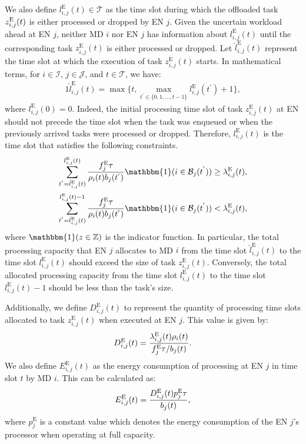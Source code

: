 \documentclass[12pt,draftclsnofoot,onecolumn]{IEEEtran}
\begin{document}
We also define $l_{i,j}^{\text{E}}(t) \in \mathcal{T}$ as the time slot during which the offloaded task $z_{i,j}^{\text{\text{E}}}(t)$ is either processed or dropped by EN $j$. Given the uncertain workload ahead at EN $j$, neither MD $i$ nor EN $j$ has information about $l_{i,j}^{\text{E}}(t)$ until the corresponding task $z_{i,j}^{\text{E}}(t)$ is either processed or dropped. Let $\hat{l}_{i,j}^{\text{E}}(t)$ represent the time slot at which the execution of task $z_{i,j}^{\text{E}}(t)$ starts. In mathematical terms, for $i \in \mathcal{I}$, $j \in \mathcal{J}$, and $t \in \mathcal{T}$, we have:
\begin{alignat}{1}
	\hat{l}_{i,j}^{\text{E}}(t) = \max \{t, \max \limits_{t^{'} \in \{0,1,\ldots,t-1\}} l_{i,j}^{\text{E}}(t^{'})+1\},
	\label{11}  
\end{alignat}
where $l_{i,j}^{\text{E}}(0) = 0$. Indeed, the initial processing time slot of task $z_{i,j}^{\text{E}}(t)$ at EN should not precede the time slot when the task was enqueued or when the previously arrived tasks were processed or dropped. Therefore, $l_{i,j}^{\text{E}}(t)$ is the time slot that satisfies the following constraints. %
\begin{alignat}{1}
	\sum_{t^{'}=\hat{l}_{i,j}^{\text{E}}(t)}^{l_{i,j}^{\text{E}}(t)}{f_j^{\text{E}}\tau \over \rho_i(t)b_j(t^{'})}\mathbbm{1}(i \in \mathcal{B}_j(t^{'}))  \geq   \lambda_{i,j}^{\text{E}}(t),
	\label{12}  \\
	\sum_{t^{'}=\hat{l}_{i,j}^{\text{E}}(t)}^{l_{i,j}^{\text{E}}(t)-1}{f_j^{\text{E}}\tau \over \rho_i(t)b_j(t^{'})}\mathbbm{1}(i \in \mathcal{B}_j(t^{'})) < \lambda_{i,j}^{\text{E}}(t),
	\label{13}  
\end{alignat}
where $\mathbbm{1} (z \in \mathbb{Z})$ is the indicator function. In particular, the total processing capacity that EN $j$ allocates to MD $i$ from the time slot $\hat{l}_{i,j}^{\text{E}}(t)$ to the time slot $l_{i,j}^{\text{E}}(t)$ should exceed the size of task $z_{i,j}^{\text{E}}(t)$. Conversely, the total allocated processing capacity from the time slot $l_{i,j}^{\text{E}}(t)$ to the time slot $l_{i,j}^{\text{E}}(t)-1$ should be less than the task's size.

Additionally, we define $D_{i,j}^{\text{E}}(t)$ to represent the quantity of processing time slots allocated to task $z_{i,j}^{\text{E}}(t)$ when executed at EN $j$. This value is given by:
\begin{alignat}{1}
	D_{i,j}^{\text{E}}(t) = { \lambda_{i,j}^{\text{E}}(t) \rho_i(t) \over f_j^{\text{E}} \tau /  b_j(t)}.
	\label{14}  
\end{alignat}
We also define $E_{i,j}^{\text{E}}(t)$ as the energy consumption of processing at EN $j$ in time slot $t$ by MD $i$. This can be calculated as:
\begin{alignat}{1}
	E_{i,j}^{\text{E}}(t) = {D_{i,j}^{\text{E}}(t)  p_j^{\text{E}} \tau \over b_j(t)},  %
	\label{15}  
\end{alignat}
where $p_j^{\text{E}}$ is a constant value which denotes the energy consumption of the EN $j$'s processor when operating at full capacity. 
\end{document}
